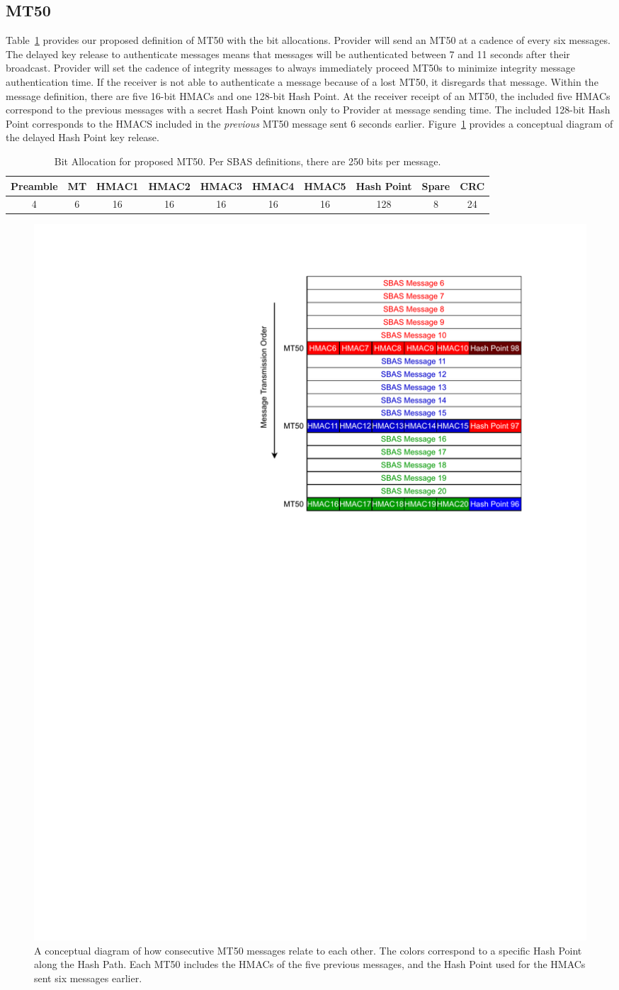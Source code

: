 \documentclass[letterpaper,times]{IONconf/IONconf}
\begin{document}
	\subsection{MT50} \label{sub:mt50}

		Table~\ref{tab: mt50} provides our proposed definition of MT50 with the bit allocations.
		Provider will send an MT50 at a cadence of every six messages.
		The delayed key release to authenticate messages means that messages will be authenticated between 7 and 11 seconds after their broadcast.
		Provider will set the cadence of integrity messages to always immediately proceed MT50s to minimize integrity message authentication time.
		If the receiver is not able to authenticate a message because of a lost MT50, it disregards that message.
		Within the message definition, there are five 16-bit HMACs and one 128-bit Hash Point.
		At the receiver receipt of an MT50, the included five HMACs correspond to the previous messages with a secret Hash Point known only to Provider at message sending time.
		The included 128-bit Hash Point corresponds to the HMACS included in the {\em previous} MT50 message sent 6 seconds earlier.
		Figure~\ref{fig: MT50 Schedule} provides a conceptual diagram of the delayed Hash Point key release.

		\begin{table}%
			\center
			\begin{tabular}{|c|c|c|c|c|c|c|c|c|c|} \hline
				Preamble & MT & HMAC1 & HMAC2 & HMAC3 & HMAC4 & HMAC5 & Hash Point & Spare & CRC \\ \hline
				4 & 6 & 16 & 16 & 16 & 16 & 16 & 128 & 8 & 24 \\ \hline
			\end{tabular}
			\caption{Bit Allocation for proposed MT50. Per SBAS definitions, there are 250 bits per message.}
			\label{tab: mt50}
		\end{table}

		\begin{figure}%
			\centering
			\includegraphics[width=0.5\linewidth]{fig/MT50Schedule.pdf}
			\caption{
				A conceptual diagram of how consecutive MT50 messages relate to each other.
				The colors correspond to a specific Hash Point along the Hash Path. Each MT50 includes the HMACs of the five previous messages, and the Hash Point used for the HMACs sent six messages earlier.
			}
			\label{fig: MT50 Schedule}
		\end{figure}
\end{document}
